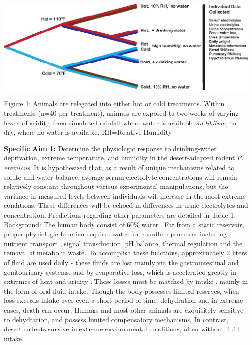 \begin{mdframed}
 \begin{center}
  \includegraphics[width=1\textwidth]{exp_design_fig.eps}
 \end{center} 

\noindent \small{Figure 1: Animals are relegated into either hot or cold treatments. Within treatments (n=40 per treatment), animals are exposed to two weeks of varying levels of aridity, from simulated rainfall where water is available \textit{ad libitum}, to dry, where no water is available. RH=Relative Humidity}

\end{mdframed}

\vspace{3mm}

\noindent \textbf{Specific Aim 1:} \ul{Determine the physiologic response to drinking-water deprivation, extreme temperature, and humidity in the desert-adapted rodent \textit{P. eremicus}}. It is hypothesized that, as a result of unique mechanisms related to solute and water balance, average serum electrolyte concentrations will remain relatively constant throughout various experimental manipulations, but the variance in measured levels between individuals will increase in the most extreme conditions. These differences will be echoed in differences in urine electrolytes and concentration. Predictions regarding other parameters are detailed in Table 1. \\

Background: The human body consist of 60\% water \citep{Jequier:2009cz}. Far from a static reservoir, proper physiologic function requires water for countless processes including nutrient transport \citep{Haussinger:1996wl}, signal transduction, pH balance, thermal regulation \citep{Montain:1999ux} and the removal of metabolic waste. To accomplish these functions, approximately 2 liters of fluid are used daily - these fluids are lost mainly via the gastrointestinal and genitourinary systems, and by evaporative loss, which is accelerated greatly in extremes of heat and aridity \citep{Cheuvront:2010eg}. These losses must be matched by intake \citep{Jequier:2009cz}, mainly in the form of oral fluid intake. Though the body possesses limited reserves, when loss exceeds intake over even a short period of time, dehydration and in extreme cases, death can occur. Humans and most other animals are exquisitely sensitive to dehydration, and possess limited compensatory mechanisms. In contrast, desert rodents survive in extreme environmental conditions, often without fluid intake. 

